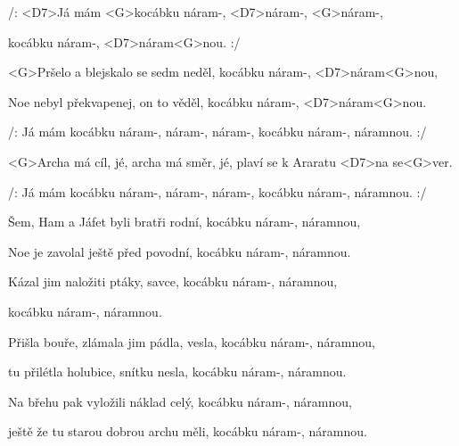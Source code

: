 

\zr
/: <D7>Já mám <G>kocábku náram-, <D7>náram-, <G>náram-,

kocábku náram-, <D7>náram<G>nou. :/
\kr

\zs
<G>Pršelo a blejskalo se sedm neděl,
kocábku náram-, <D7>náram<G>nou,

Noe nebyl překvapenej, on to věděl,
kocábku náram-, <D7>náram<G>nou.
\ks

\zr
/: Já mám kocábku náram-, náram-, náram-, kocábku náram-, náramnou. :/

<G>Archa má cíl, jé, archa má směr, jé,
plaví se k Araratu <D7>na se<G>ver.

/: Já mám kocábku náram-, náram-, náram-, kocábku náram-, náramnou. :/
\kr

\zs
Šem, Ham a Jáfet byli bratři rodní,
kocábku náram-, náramnou,

Noe je zavolal ještě před povodní,
kocábku náram-, náramnou.
\ks

\zs
Kázal jim naložiti ptáky, savce,
kocábku náram-, náramnou,

kocábku náram-, náramnou.
\ks

\zr \kr

\zs
Přišla bouře, zlámala jim pádla, vesla,
kocábku náram-, náramnou,

tu přilétla holubice, snítku nesla,
kocábku náram-, náramnou.
\ks

\zs
Na břehu pak vyložili náklad celý,
kocábku náram-, náramnou,

ještě že tu starou dobrou archu měli,
kocábku náram-, náramnou.
\ks

\zr \kr

\kp
